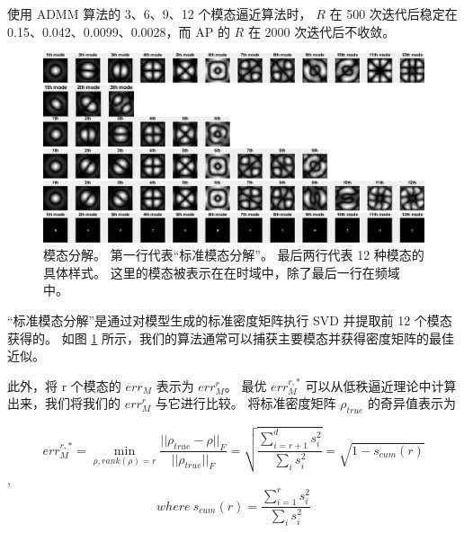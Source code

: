 \documentclass[12pt]{article}
\begin{document}
使用 ADMM 算法的 3、6、9、12 个模态逼近算法时， $R$ 在 500 次迭代后稳定在 0.15、0.042、0.0099、0.0028，而 AP 的 $R$ 在 2000 次迭代后不收敛。


\begin{figure}[H]
	\centering
	\includegraphics[width=1\linewidth]{../figures/modes_combine}
	\caption{%
	模态分解。 第一行代表“标准模态分解”。 最后两行代表 12 种模态的具体样式。 这里的模态被表示在在时域中，除了最后一行在频域中。}
	\label{fig:modescombine}
\end{figure}

“标准模态分解”是通过对模型生成的标准密度矩阵执行 SVD 并提取前 12 个模态获得的。 如图 \ref{fig:modescombine} 所示，我们的算法通常可以捕获主要模态并获得密度矩阵的最佳近似。

此外，将 r 个模态的 $err_M$ 表示为 $err_M^r$。 最优 $err_M^{r,*}$ 可以从低秩逼近理论中计算出来，我们将我们的 $err_M^r$ 与它进行比较。 将标准密度矩阵 $\rho_{true}$ 的奇异值表示为

$$
err_M^{r,*} = \min_{\rho, rank(\rho)=r} \dfrac{||\rho_{true} - \rho||_F}{||\rho_{true}||_F} = \sqrt{\dfrac{\sum_{i=r+1}^{d}s_i^2}{\sum_i s_i^2}}
=
\sqrt{1 - s_{cum}(r)}
$$,
$$
where\ 
s_{cum}(r) = \dfrac{\sum_{i=1}^{r}s_i^2}{\sum_i s_i^2} 
$$
\end{document}
